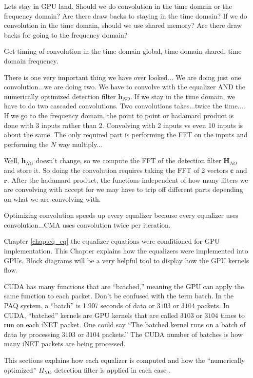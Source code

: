 Lets stay in GPU land.
Should we do convolution in the time domain or the frequency domain?
Are there draw backs to staying in the time domain? 
If we do convolution in the time domain, should we use shared memory?
Are there draw backs for going to the frequency domain? 

Get timing of convolution in the time domain global, time domain shared, time domain frequency.

There is one very important thing we have over looked...
We are doing just one convolution...we are doing two.
We have to convolve with the equalizer AND the numerically optimized detection filter $\mathbf{h}_{NO}$.
If we stay in the time domain, we have to do two cascaded convolutions.
Two convolutions takes...twice the time....
If we go to the frequency domain, the point to point or hadamard product is done with 3 inputs rather than 2.
Convolving with 2 inputs vs even 10 inputs is about the same.
The only required part is performing the FFT on the inputs and performing the $N$ way multiply...

Well, $\mathbf{h}_{NO}$ doesn't change, so we compute the FFT of the detection filter $\mathbf{H}_{NO}$ and store it.
So doing the convolution requires taking the FFT of 2 vectors $\mathbf{c}$ and $\mathbf{r}$.
After the hadamard product, the functions independent of how many filters we are convolving with accept for we may have to trip off different parts depending on what we are convolving with.

Optimizing convolution speeds up every equalizer because every equalizer uses convolution...CMA uses convolution twice per iteration. 

Chapter \ref{chap:eq_eq} the equalizer equations were conditioned for GPU implementation.
This Chapter explains how the equalizers were implemented into GPUs.
Block diagrams will be a very helpful tool to display how the GPU kernels flow.

CUDA has many functions that are ``batched,'' meaning the GPU can apply the same function to each packet.
Don't be confused with the term batch. 
In the PAQ system, a ``batch'' is 1.907 seconds of data or $3103$ or $3104$ packets.
In CUDA, ``batched'' kernels are GPU kernels that are called $3103$ or $3104$ times to run on each iNET packet.
One could say ``The batched kernel runs on a batch of data by processing $3103$ or $3104$ packets.'' 
The CUDA number of batches is how many iNET packets are being processed.

This sections explains how each equalizer is computed and how the ``numerically optimized'' $H_\text{NO}$ detection filter is applied in each case \cite[Fig. 3]{perrins:2013}.






